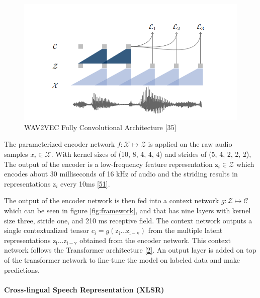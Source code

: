 \documentclass[
  a4paper,
]{article}
\begin{document}
\begin{figure}

{\centering \includegraphics{wav2vec} 

}

\caption{WAV2VEC Fully Convolutional Architecture [35]}\label{fig:wav2vec}
\end{figure}

The parameterized encoder network
\(f : \mathcal{X} \mapsto \mathcal{Z}\) is applied on the raw audio
samples \(x_i \in \mathcal{X}\). With kernel sizes of (10, 8, 4, 4, 4)
and strides of (5, 4, 2, 2, 2), The output of the encoder is a
low-frequency feature representation \(\mathrm{z}_i \in \mathcal{Z}\)
which encodes about 30 milliseconds of 16 kHz of audio and the striding
results in representations \(\mathrm{z}_i\) every 10ms
\protect\hyperlink{ref-schneider2019wav2vec}{{[}51{]}}.

The output of the encoder network is then fed into a context network
\(g : \mathcal{Z} \mapsto \mathcal{C}\) which can be seen in figure
\ref{fig:framework}, and that has nine layers with kernel size three,
stride one, and 210 ms receptive field. The context network outputs a
single contextualized tensor
\(c_i = g(\mathrm{z_i}... \mathrm{z_{i-v}})\) from the multiple latent
representations \(\mathrm{z_i}... \mathrm{z_{i-v}}\) obtained from the
encoder network. This context network follows the Transformer
architecture \protect\hyperlink{ref-2020arXiv200611477B}{{[}2{]}}. An
output layer is added on top of the transformer network to fine-tune the
model on labeled data and make predictions.

\hypertarget{cross-lingual-speech-representation-xlsr}{%
\paragraph{\texorpdfstring{Cross-lingual Speech Representation (XLSR)
\newline \newline}{Cross-lingual Speech Representation (XLSR) }}\label{cross-lingual-speech-representation-xlsr}}
\end{document}
